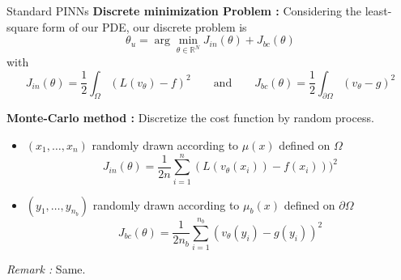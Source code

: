 \begin{frame}{Standard PINNs}
	\textbf{Discrete minimization Problem :} Considering the least-square form of our PDE, our discrete problem is
	\begin{equation}
		\theta_u=\arg\min_{\theta\in\mathbb{R}^N} J_{in}(\theta)+J_{bc}(\theta) \label{minpb_pinns}
	\end{equation}
	with 
	\begin{equation*}
		J_{in}(\theta)=\frac{1}{2}\int_\Omega (L(v_\theta) - f)^2  \qquad \text{and} \qquad J_{bc}(\theta)=\frac{1}{2}\int_{\partial\Omega} (v_\theta-g)^2
	\end{equation*}	
	
	\textbf{Monte-Carlo method :} Discretize the cost function by random process.
	
	\begin{itemize}[\textbullet]
		\item $(x_1,\dots,x_n)$ randomly drawn according to $\mu(x)$ defined on $\Omega$ 
		\begin{equation*}
			J_{in}(\theta)=\frac{1}{2n}\sum_{i=1}^n (L(v_\theta(x_i)) - f(x_i)))^2
		\end{equation*}
		\item $(y_1,\dots,y_{n_b})$ randomly drawn according to $\mu_b(x)$ defined on $\partial\Omega$
		\begin{equation*}
			J_{bc}(\theta)=\frac{1}{2n_b}\sum_{i=1}^{n_b} (v_\theta(y_i)-g(y_i))^2
		\end{equation*}
	\end{itemize}	

	\footnotesize
	\textit{Remark :} Same.
\end{frame}

